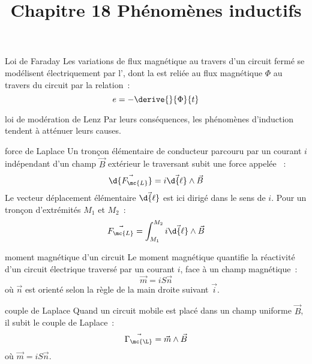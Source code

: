 

\setcounter{chapitre}{18}

\title{\Large Chapitre 18 \newline \Huge Phénomènes inductifs}



\maketitle

\begin{theoreme}{}{Loi de Faraday}
    Les variations de flux magnétique au travers d’un circuit fermé se modélisent électriquement par l’, dont la  est reliée au flux magnétique $\Phi$ au travers du circuit par la relation~:
    $$e = - \derive{}{\Phi}{t}$$
\end{theoreme}

\begin{theoreme}{}{loi de modération de Lenz}
    Par leurs conséquences, les phénomènes d’induction tendent à atténuer leurs causes.
\end{theoreme}

\begin{definition}{}{force de Laplace}
    Un tronçon élémentaire de conducteur parcouru par un courant $i$ indépendant d'un champ $\vec{B}$ extérieur le traversant subit une force appelée ~:
    $$\vec{\d{F_\mc{L}}} = i\vec{\d{\ell}}\wedge \vec{B}$$
    Le vecteur déplacement élémentaire $\vec{\d{\ell}}$ est ici dirigé dans le sens de $i$. Pour un tronçon d'extrémités $M_1$ et $M_2$~:
    $$\vec{F_\mc{L}} = \int_{M_1}^{M_2} i\vec{\d{\ell}}\wedge \vec{B}$$
\end{definition}

\begin{definition}{}{moment magnétique d'un circuit}
    Le moment magnétique quantifie la réactivité d'un circuit électrique traversé par un courant $i$, face à un champ magnétique~:
    $$\vec{m} = iS\vec{n}$$
    où $\vec{n}$ est orienté selon la règle de la main droite suivant $\vec{i}$.
\end{definition}

\begin{definition}{}{couple de Laplace}
    Quand un circuit mobile est placé dans un champ uniforme $\vec{B}$, il subit le couple de Laplace~:
    $$\vec{\Gamma_\mc{\L}} = \vec{m} \wedge \vec{B}$$
    où $\vec{m} = iS\vec{n}$.
\end{definition}



